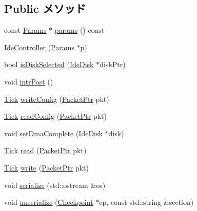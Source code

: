 \subsection*{Public メソッド}
\begin{DoxyCompactItemize}
\item 
const \hyperlink{classIdeController_ac3896424d9bf2d8a838f1e2c38870d02}{Params} $\ast$ \hyperlink{classIdeController_acd3c3feb78ae7a8f88fe0f110a718dff}{params} () const 
\item 
\hyperlink{classIdeController_a3e91790659f429bea2b288d4809e97ab}{IdeController} (\hyperlink{classIdeController_ac3896424d9bf2d8a838f1e2c38870d02}{Params} $\ast$p)
\item 
bool \hyperlink{classIdeController_ab16ba5b7c8f5e314b4003eb4bf9d40bf}{isDiskSelected} (\hyperlink{classIdeDisk}{IdeDisk} $\ast$diskPtr)
\item 
void \hyperlink{classIdeController_aba6fa755ca152cedafeb4150da6a2493}{intrPost} ()
\item 
\hyperlink{base_2types_8hh_a5c8ed81b7d238c9083e1037ba6d61643}{Tick} \hyperlink{classIdeController_aac7b61a78530109bfa20923a53064bbf}{writeConfig} (\hyperlink{classPacket}{PacketPtr} pkt)
\item 
\hyperlink{base_2types_8hh_a5c8ed81b7d238c9083e1037ba6d61643}{Tick} \hyperlink{classIdeController_a9dfb5284eadd79fffef97ba1bd69f3c4}{readConfig} (\hyperlink{classPacket}{PacketPtr} pkt)
\item 
void \hyperlink{classIdeController_ab3f8a4d9fa9f33c71d23a803142e9faa}{setDmaComplete} (\hyperlink{classIdeDisk}{IdeDisk} $\ast$disk)
\item 
\hyperlink{base_2types_8hh_a5c8ed81b7d238c9083e1037ba6d61643}{Tick} \hyperlink{classIdeController_a613ec7d5e1ec64f8d21fec78ae8e568e}{read} (\hyperlink{classPacket}{PacketPtr} pkt)
\item 
\hyperlink{base_2types_8hh_a5c8ed81b7d238c9083e1037ba6d61643}{Tick} \hyperlink{classIdeController_a4cefab464e72b5dd42c003a0a4341802}{write} (\hyperlink{classPacket}{PacketPtr} pkt)
\item 
void \hyperlink{classIdeController_a53e036786d17361be4c7320d39c99b84}{serialize} (std::ostream \&os)
\item 
void \hyperlink{classIdeController_af22e5d6d660b97db37003ac61ac4ee49}{unserialize} (\hyperlink{classCheckpoint}{Checkpoint} $\ast$cp, const std::string \&section)
\end{DoxyCompactItemize}
